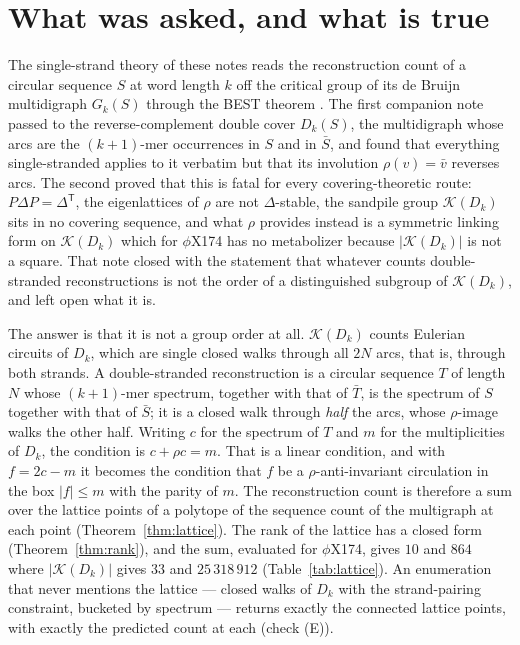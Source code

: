 \documentclass[11pt]{article}
\theoremstyle{plain}
\theoremstyle{definition}
\theoremstyle{remark}
\newcommand{\K}{\mathcal{K}}
\begin{document}
\section{What was asked, and what is true}

The single-strand theory of these notes reads the reconstruction count of a circular sequence
$S$ at word length $k$ off the critical group of its de Bruijn multidigraph $G_k(S)$ through
the BEST theorem \cite{AEdB,SmithTutte}. The first companion note \cite{Bio6} passed to the
reverse-complement double cover $D_k(S)$, the multidigraph whose arcs are the $(k{+}1)$-mer
occurrences in $S$ and in $\bar S$, and found that everything single-stranded applies to it
verbatim but that its involution $\rho(v)=\bar v$ reverses arcs. The second \cite{Bio7} proved
that this is fatal for every covering-theoretic route: $P\Delta P=\Delta^{\mathsf T}$, the
eigenlattices of $\rho$ are not $\Delta$-stable, the sandpile group $\K(D_k)$ sits in no
covering sequence, and what $\rho$ provides instead is a symmetric linking form on $\K(D_k)$
which for $\phi$X174 has no metabolizer because $|\K(D_k)|$ is not a square. That note closed
with the statement that whatever counts double-stranded reconstructions is not the order of a
distinguished subgroup of $\K(D_k)$, and left open what it is.

The answer is that it is not a group order at all. $\K(D_k)$ counts Eulerian circuits of
$D_k$, which are single closed walks through all $2N$ arcs, that is, through both strands.
A double-stranded reconstruction is a circular sequence $T$ of length $N$ whose
$(k{+}1)$-mer spectrum, together with that of $\bar T$, is the spectrum of $S$ together with
that of $\bar S$; it is a closed walk through \emph{half} the arcs, whose $\rho$-image walks
the other half. Writing $c$ for the spectrum of $T$ and $m$ for the multiplicities of $D_k$,
the condition is $c+\rho c=m$. That is a linear condition, and with $f=2c-m$ it becomes the
condition that $f$ be a $\rho$-anti-invariant circulation in the box $|f|\le m$ with the parity
of $m$. The reconstruction count is therefore a sum over the lattice points of a polytope of
the sequence count of the multigraph at each point (Theorem~\ref{thm:lattice}). The rank of
the lattice has a closed form (Theorem~\ref{thm:rank}), and the sum, evaluated for $\phi$X174,
gives $10$ and $864$ where $|\K(D_k)|$ gives $33$ and $25\,318\,912$ (Table~\ref{tab:lattice}).
An enumeration that never mentions the lattice --- closed walks of $D_k$ with the
strand-pairing constraint, bucketed by spectrum --- returns exactly the connected lattice
points, with exactly the predicted count at each (check (E)).
\end{document}
